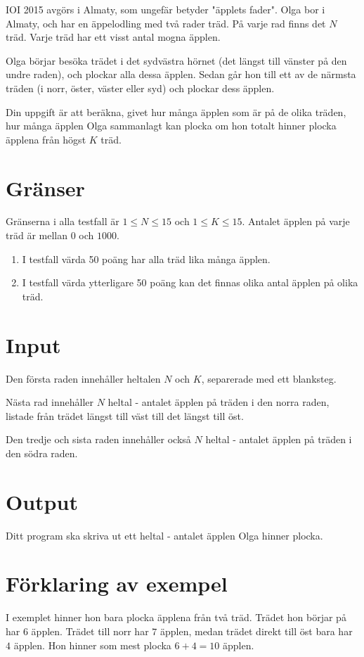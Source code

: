 
IOI 2015 avgörs i Almaty, som ungefär betyder "äpplets fader". Olga bor i Almaty, och har en äppelodling med två rader träd.
På varje rad finns det $N$ träd. Varje träd har ett visst antal mogna äpplen.

Olga börjar besöka trädet i det sydvästra hörnet (det längst till vänster på den undre raden), och plockar alla dessa äpplen.
Sedan går hon till ett av de närmsta träden (i norr, öster, väster eller syd) och plockar dess äpplen.

Din uppgift är att beräkna, givet hur många äpplen som är på de olika träden, hur många äpplen Olga sammanlagt kan plocka
om hon totalt hinner plocka äpplena från högst $K$ träd.

\section*{Gränser}
Gränserna i alla testfall är $1 \le N \le 15$ och $1 \le K \le 15$. Antalet äpplen på varje
träd är mellan $0$ och $1000$.

\begin{enumerate}
\item I testfall värda 50 poäng har alla träd lika många äpplen.
\item I testfall värda ytterligare 50 poäng kan det finnas olika antal äpplen på olika träd.
\end{enumerate}

\section*{Input}
Den första raden innehåller heltalen $N$ och $K$, separerade med ett blanksteg.

Nästa rad innehåller $N$ heltal - antalet äpplen på träden i den norra raden, listade från trädet längst till väst till det längst till öst.

Den tredje och sista raden innehåller också $N$ heltal - antalet äpplen på träden i den södra raden.

\section*{Output}
Ditt program ska skriva ut ett heltal - antalet äpplen Olga hinner plocka.

\section*{Förklaring av exempel}
I exemplet hinner hon bara plocka äpplena från två träd. Trädet hon börjar på har $6$ äpplen. Trädet till norr har $7$ äpplen, medan 
trädet direkt till öst bara har $4$ äpplen. Hon hinner som mest plocka $6 + 4 = 10$ äpplen.
